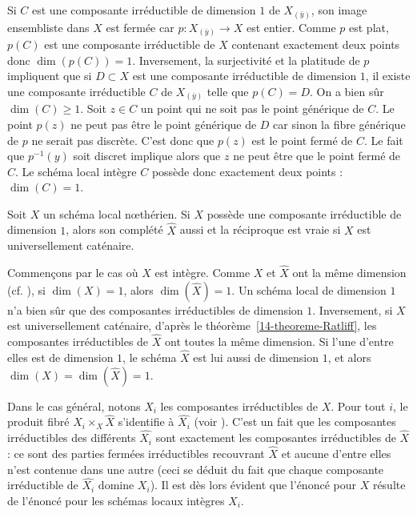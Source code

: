 \documentclass[10pt]{../fichiers-configuration-latex/smfart}
\begin{document}
\begin{démo} Si $C$ est une composante irréductible de dimension $1$ de $X_{(\bar y)}$, son image
ensembliste dans $X$ est fermée car $p\colon X_{(\bar y)}\to X$ est entier. Comme $p$ est plat,
$p(C)$ est une composante irréductible de $X$ contenant exactement deux points donc $\dim(p(C))=1$.
Inversement, la surjectivité et la platitude de $p$ impliquent que si $D\subset X$ est une
composante irréductible de dimension $1$, il existe une composante irréductible $C$ de $X_{(\bar
y)}$ telle que $p(C)=D$. On a bien sûr $\dim(C)\geq 1$. Soit $z\in C$ un point qui ne soit pas le
point générique de $C$. Le point $p(z)$ ne peut pas être le point générique de $D$ car sinon la
fibre générique de $p$ ne serait pas discrète. C'est donc que $p(z)$ est le point fermé de $C$. Le
fait que $p^{-1}(y)$ soit discret implique alors que $z$ ne peut être que le point fermé de $C$.  Le
schéma local intègre $C$ possède donc exactement deux points : $\dim(C)=1$.  \end{démo}

\begin{lemme2}\label{14-lemme-riou-2} Soit $X$ un schéma local nœthérien. Si $X$ possède une
composante irréductible de dimension $1$, alors son complété $\widehat{X}$ aussi et la réciproque
est vraie si $X$ est universellement caténaire.  \end{lemme2}

\begin{démo} Commençons par le cas où $X$ est intègre. Comme $X$ et $\widehat{X}$ ont la même
dimension (cf. \cite[chap.~VIII, \S{}9]{CA@Zariski-Samuel}), si $\dim(X)=1$, alors
$\dim(\widehat{X})=1$. Un schéma local de dimension $1$ n'a bien sûr que des composantes
irréductibles de dimension $1$. Inversement, si $X$ est universellement caténaire, d'après le
théorème~\ref{14-theoreme-Ratliff}, les composantes irréductibles de $\widehat{X}$ ont toutes la
même dimension. Si l'une d'entre elles est de dimension $1$, le schéma $\widehat{X}$ est lui aussi
de dimension $1$, et alors $\dim(X)=\dim(\widehat{X})=1$.

Dans le cas général, notons $X_i$ les composantes irréductibles de $X$.  Pour tout $i$, le produit
fibré $X_i\times_X \widehat{X}$ s'identifie à $\widehat{X_i}$ (voir ). C'est un fait
que les composantes irréductibles des différents $\widehat{X_i}$ sont exactement les composantes
irréductibles de $\widehat{X}$ : ce sont des parties fermées irréductibles recouvrant $\widehat{X}$
et aucune d'entre elles n'est contenue dans une autre (ceci se déduit du fait que chaque composante
irréductible de $\widehat{X_i}$ domine $X_i$). Il est dès lors évident que l'énoncé pour $X$ résulte
de l'énoncé pour les schémas locaux intègres $X_i$.  \end{démo}
\end{document}
